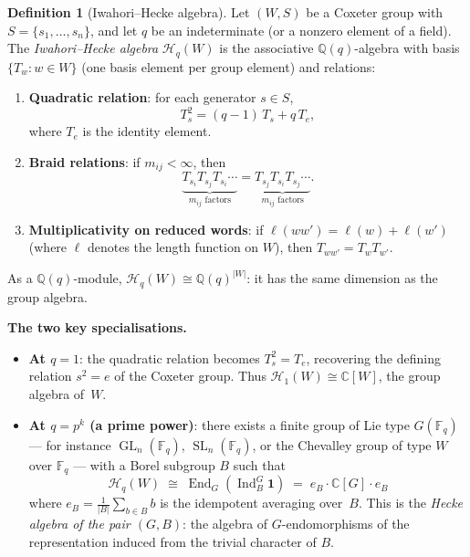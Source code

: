 \documentclass[11pt,a4paper]{article}
\theoremstyle{plain}
\theoremstyle{definition}
\newtheorem{definition}[theorem]{Definition}
\newcommand{\C}{\mathbb{C}}
\newcommand{\Q}{\mathbb{Q}}
\newcommand{\F}{\mathbb{F}}
\newcommand{\GL}{\operatorname{GL}}
\newcommand{\SL}{\operatorname{SL}}
\newcommand{\Ind}{\operatorname{Ind}}
\newcommand{\End}{\operatorname{End}}
\begin{document}
\begin{tcolorbox}[breakable, colback=green!8, colframe=green!8,
  boxrule=0pt, sharp corners]
\begin{definition}[Iwahori--Hecke algebra]
\label{def:hecke}
Let $(W, S)$ be a Coxeter group with $S = \{s_1, \ldots, s_n\}$, and
let $q$ be an indeterminate (or a nonzero element of a field). The
\emph{Iwahori--Hecke algebra} $\mathcal{H}_q(W)$ is the associative
$\Q(q)$-algebra with basis $\{T_w : w \in W\}$ (one basis element
per group element) and relations:
\begin{enumerate}
\item \textbf{Quadratic relation}: for each generator $s \in S$,
\begin{equation}
\label{eq:hecke-quad}
  T_s^2 = (q - 1)\, T_s + q\, T_e,
\end{equation}
where $T_e$ is the identity element.

\item \textbf{Braid relations}: if $m_{ij} < \infty$, then
\[
  \underbrace{T_{s_i} T_{s_j} T_{s_i} \cdots}_{m_{ij} \text{ factors}}
  = \underbrace{T_{s_j} T_{s_i} T_{s_j} \cdots}_{m_{ij} \text{ factors}}.
\]

\item \textbf{Multiplicativity on reduced words}: if
$\ell(ww') = \ell(w) + \ell(w')$ (where $\ell$ denotes the length
function on $W$), then $T_{ww'} = T_w T_{w'}$.
\end{enumerate}

As a $\Q(q)$-module, $\mathcal{H}_q(W) \cong \Q(q)^{|W|}$: it has
the same dimension as the group algebra.
\end{definition}
\end{tcolorbox}

\begin{tcolorbox}[breakable, colback=yellow!12, colframe=yellow!12,
  boxrule=0pt, sharp corners]
\textbf{The two key specialisations.}

\begin{itemize}
\item \textbf{At $q = 1$}: the quadratic relation becomes
  $T_s^2 = T_e$, recovering the defining relation $s^2 = e$ of the
  Coxeter group. Thus $\mathcal{H}_1(W) \cong \C[W]$, the group
  algebra of~$W$.

\item \textbf{At $q = p^k$ (a prime power)}: there exists a finite
  group of Lie type $G(\F_q)$ --- for instance
  $\GL_n(\F_q)$, $\SL_n(\F_q)$, or the Chevalley group of type $W$
  over $\F_q$ --- with a Borel subgroup $B$ such that
  \[
    \mathcal{H}_q(W)
    \;\cong\;
    \End_G\!\left(\Ind_B^G \mathbf{1}\right)
    \;=\;
    e_B \cdot \C[G] \cdot e_B
  \]
  where $e_B = \frac{1}{|B|}\sum_{b \in B} b$ is the idempotent
  averaging over~$B$. This is the \emph{Hecke algebra of the pair
  $(G, B)$}: the algebra of $G$-endomorphisms of the representation
  induced from the trivial character of $B$.
\end{itemize}
\end{tcolorbox}
\end{document}
